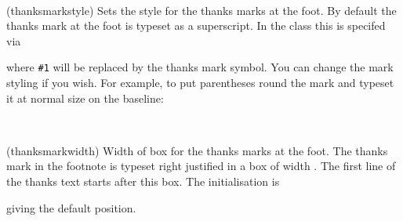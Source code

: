 
\begin{syntax}
\cmd{\thanksmarkstyle} \\
\end{syntax}
\glossary(thanksmarkstyle)%
  {}%
  {Sets the style for the thanks marks at the foot.}
By default the thanks mark at the foot is typeset as a superscript. In
the class this is specifed via
\begin{lcode}
\end{lcode}
where \verb?#1? will be replaced by the thanks mark symbol. You can change
the mark styling
if you wish. For example, to put parentheses round the
mark and typeset it at normal size on the baseline:
\begin{lcode}
\end{lcode}


\begin{syntax}
\lnc{\thanksmarkwidth} \\
\end{syntax}
\glossary(thanksmarkwidth)%
  {}%
  {Width of box for the thanks marks at the foot.}
 The thanks mark in the footnote is typeset right justified in a box
of width \lnc{\thanksmarkwidth}. The first line of the thanks text starts
after this box. The initialisation is 
\begin{lcode}
\setlength{\thanksmarkwidth}{1.8em}
\end{lcode}
giving the default position.

